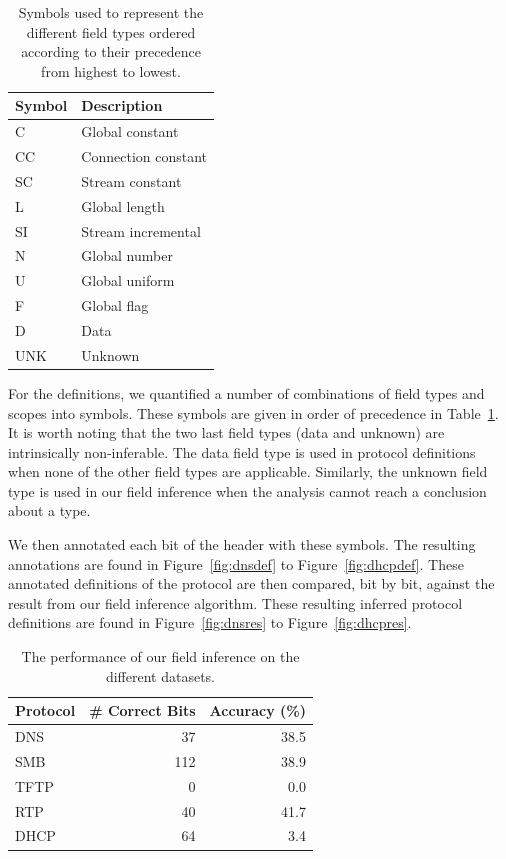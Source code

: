 \documentclass[a4paper]{report}
\begin{document}
\begin{table}[h]
    \centering
    \captionsetup{width=0.8\textwidth}
    \caption{Symbols used to represent the different field types ordered
    according to their precedence from highest to lowest.}
    \begin{tabular}{| l | l |}
        \hline
        \textbf{Symbol}&\textbf{Description} \\ \hline
        C   & Global constant \\ \hline
        CC  & Connection constant \\ \hline
        SC  & Stream constant \\ \hline
        L   & Global length \\ \hline
        SI  & Stream incremental \\ \hline
        N   & Global number \\ \hline
        U   & Global uniform \\ \hline
        F   & Global flag \\ \hline
        D   & Data \\ \hline
        UNK & Unknown \\ \hline
    \end{tabular}
    \label{tab:symbols}
\end{table}

For the definitions, we quantified a number of combinations of field types and
scopes into symbols. These symbols are given in order of precedence in
Table~\ref{tab:symbols}. It is worth noting that the two last field types (data
and unknown) are intrinsically non-inferable. The data field type is used in
protocol definitions when none of the other field types are applicable.
Similarly, the unknown field type is used in our field inference when the
analysis cannot reach a conclusion about a type.

We then annotated each bit of the header with these symbols. The resulting
annotations are found in Figure~\ref{fig:dnsdef} to Figure~\ref{fig:dhcpdef}.
These annotated definitions of the protocol are then compared, bit by bit,
against the result from our field inference algorithm. These resulting inferred
protocol definitions are found in Figure~\ref{fig:dnsres} to
Figure~\ref{fig:dhcpres}.

\begin{table}[h]
    \centering
    \captionsetup{width=0.8\textwidth}
    \caption{The performance of our field inference on the different datasets.}
    \begin{tabular}{| l | r | r |}
        \hline
        \textbf{Protocol}&\textbf{\# Correct Bits}&\textbf{Accuracy (\%)} \\ \hline
        DNS & 37 & 38.5 \\ \hline
        SMB & 112 & 38.9 \\ \hline
        TFTP & 0 & 0.0 \\ \hline
        RTP & 40 & 41.7 \\ \hline
        DHCP & 64 & 3.4 \\ \hline
    \end{tabular}
    \label{tab:accuracy}
\end{table}
\end{document}
